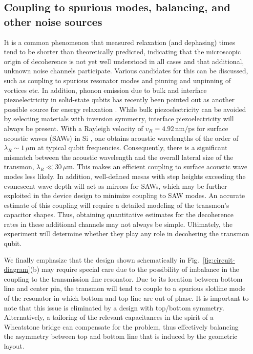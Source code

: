 \documentclass[twocolumn,amsmath,amssymb,floatfix,pra,showpacs,eqsecnum,footinbib,superscriptaddress]{revtex4}
\newcounter{fig}
\begin{document}
\subsection{Coupling to spurious modes, balancing, and other noise sources}
It is a common phenomenon that measured relaxation (and dephasing) times tend to be shorter than theoretically predicted, indicating that the microscopic origin of decoherence is not yet well understood in all cases and that additional, unknown noise channels participate. Various candidates for this can be discussed, such as coupling to spurious resonator modes and pinning and unpinning of vortices etc. In addition, phonon emission due to bulk and interface piezoelectricity in solid-state qubits has recently been pointed out as another possible source for energy relaxation \cite{ioffe}. While bulk piezoelectricity can be avoided by selecting materials with inversion symmetry, interface piezoelectricity will always be present. With a Rayleigh velocity of $v_R=4.92\,\text{nm}/\text{ps}$ for surface acoustic waves (SAWs) in Si \cite{hurley}, one obtains acoustic wavelengths of the order of $\lambda_R\sim 1\,\mu\text{m}$ at typical qubit frequencies. Consequently, there is a significant mismatch between the acoustic wavelength and the overall lateral size of the transmon, $\lambda_R\ll  30\,\mu\text{m}$. This makes an efficient coupling to surface acoustic wave modes less likely. In addition, well-defined mesas with step heights exceeding the evanescent wave depth will act as mirrors for SAWs, which may be further exploited in the device design to minimize coupling to SAW modes. An accurate estimate of this coupling will require a detailed modeling of the transmon's capacitor shapes.
 Thus, obtaining quantitative estimates for the decoherence rates in these additional channels may not always be simple. 
 Ultimately, the experiment will determine whether they play any role in decohering the transmon qubit.

We finally emphasize that the design shown schematically in Fig.~\ref{fig:circuit-diagram}(b) may require special care due to the possibility of imbalance in the coupling to the transmission line resonator. Due to its location between bottom line and center pin, the transmon will tend to couple to a spurious slotline mode of the resonator in which bottom and top line are out of phase. It is important to note that this issue is eliminated by a design with top/bottom symmetry. Alternatively, a tailoring of the relevant capacitances in the spirit of a Wheatstone bridge can compensate for the problem, thus effectively balancing the asymmetry between top and bottom line that is induced by the geometric layout.
\end{document}
